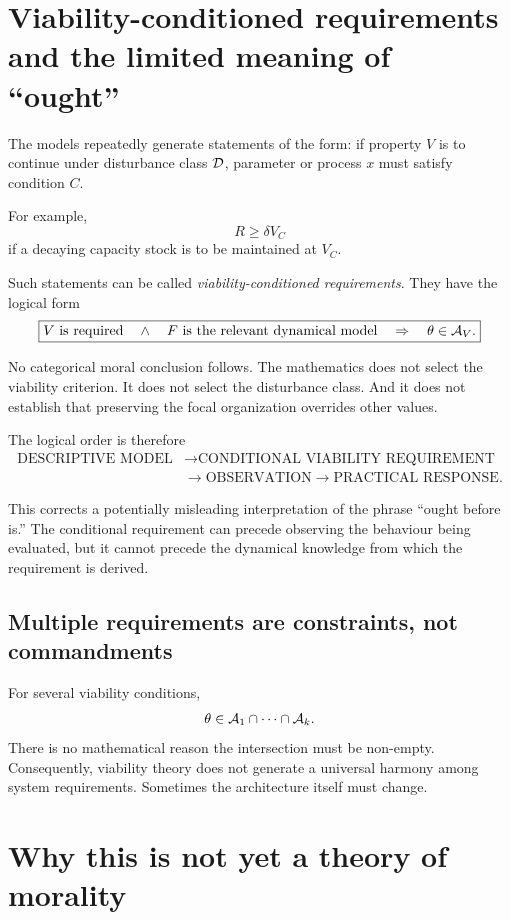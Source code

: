 \section{Viability-conditioned requirements and the limited meaning of ``ought''}

The models repeatedly generate statements of the form: if property \(V\) is to continue under disturbance class \(\mathcal D\), parameter or process \(x\) must satisfy condition \(C\).

For example,
\[
R\ge\delta V_C
\]
if a decaying capacity stock is to be maintained at \(V_C\).

Such statements can be called \emph{viability-conditioned requirements}. They have the logical form
\[
\boxed{
V\text{ is required}
\quad\land\quad
F\text{ is the relevant dynamical model}
\quad\Rightarrow\quad
\theta\in\mathcal A_V.
}
\]

No categorical moral conclusion follows. The mathematics does not select the viability criterion. It does not select the disturbance class. And it does not establish that preserving the focal organization overrides other values.

The logical order is therefore
\[
\boxed{
\begin{aligned}
\text{DESCRIPTIVE MODEL}
&\rightarrow \text{CONDITIONAL VIABILITY REQUIREMENT}\\
&\rightarrow \text{OBSERVATION}
\rightarrow \text{PRACTICAL RESPONSE}.
\end{aligned}
}
\]

This corrects a potentially misleading interpretation of the phrase ``ought before is.'' The conditional requirement can precede observing the behaviour being evaluated, but it cannot precede the dynamical knowledge from which the requirement is derived.

\subsection{Multiple requirements are constraints, not commandments}

For several viability conditions,
\[
\theta
\in
\mathcal A_1\cap\dots\cap\mathcal A_k.
\]
There is no mathematical reason the intersection must be non-empty. Consequently, viability theory does not generate a universal harmony among system requirements. Sometimes the architecture itself must change.

\section{Why this is not yet a theory of morality}

